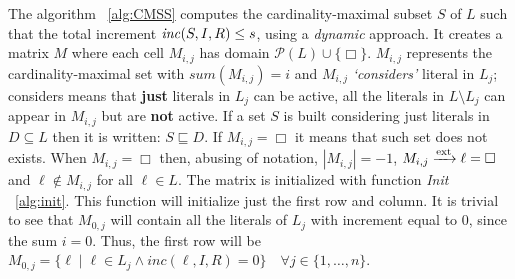 The algorithm ~\ref{alg:CMSS} computes the cardinality-maximal subset $S$ of $L$ such that 
the total increment $\mathit{inc}(S,I,R) \le s$, using a \textit{dynamic} approach.
It creates a matrix $M$ where each cell $M_{i,j}$ has domain $\mathcal{P}(L) \cup \{\Box\}$.
$M_{i,j}$ represents the cardinality-maximal set with $sum(M_{i,j}) = i$ and $M_{i,j}$ \textit{`considers'} 
literal in $L_j$; considers means that \textbf{just} literals in $L_j$ can be active, all the literals 
in $L \setminus L_j$ can appear in $M_{i,j}$ but are \textbf{not} active. 
If a set $S$ is built considering just literals in $D \subseteq L$ then 
it is written: $S \sqsubseteq D$.
If $M_{i,j} = \Box$ it means that such set does not exists.
When $M_{i,j} = \Box$ then, abusing of notation, $|M_{i,j}| = -1$,
$M_{i,j} \xrightarrow{\text{ext}} \ell = \Box$ and $\ell \not\in M_{i,j}$ for all $\ell \in L$.
The matrix is initialized with function \textit{Init} ~\ref{alg:init}.
This function will initialize just the first row and column.
It is trivial to see that $M_{0,j}$ will contain all the literals of $L_j$ 
with increment equal to 0, since the sum $i = 0$.
Thus, the first row will be 
$M_{0,j} = \{ \ell \mid \ell \in L_j \land inc(\ell,I,R) = 0\} \quad \forall j \in \{1, \hdots , n\}$.

